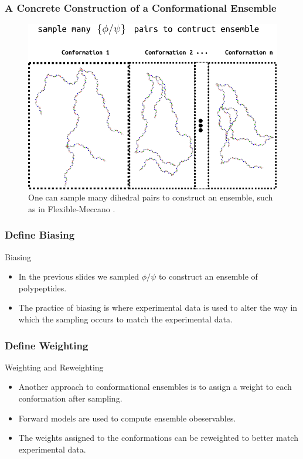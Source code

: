 \documentclass{beamer}
\begin{document}
\begin{frame}
\frametitle{A Concrete Construction of a Conformational Ensemble}
\begin{figure}
    \centering
    \includegraphics[scale=0.4]{concrete-ensemble.png}
    \caption{One can sample many dihedral pairs to construct an ensemble, such as in Flexible-Meccano \cite{ozenneFlexiblemeccanoToolGeneration2012}. }
    \label{fig:concrete-ensemble}
\end{figure}
\end{frame}

\begin{frame}
\frametitle{Define Biasing}
\begin{block}{Biasing}
    \begin{itemize}
        \item In the previous slides we sampled $\phi/\psi$ to construct an ensemble of polypeptides. 
        \item The practice of biasing is where experimental data is used to alter the way in which the sampling occurs to match the experimental data.
    \end{itemize}
\end{block}
\end{frame}

\begin{frame}
\frametitle{Define Weighting}
\begin{block}{Weighting and Reweighting}
    \begin{itemize}
        \item Another approach to conformational ensembles is to assign a weight to each conformation after sampling.
        \item Forward models are used to compute ensemble obeservables.
        \item The weights assigned to the conformations can be reweighted to better match experimental data.
    \end{itemize}
\end{block}
\end{frame}
\end{document}
